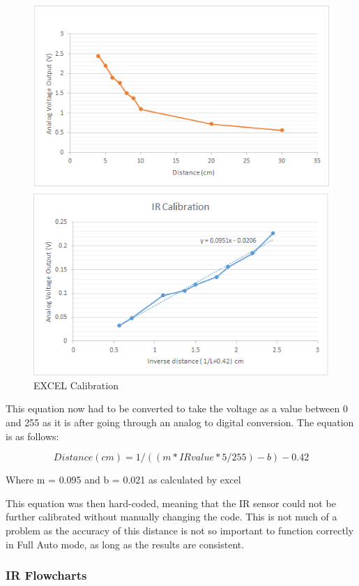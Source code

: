 \documentclass[MTRX3700report.tex]{subfiles}
\begin{document}
\begin{figure}[h]
	\includegraphics[scale=1]{IR_calibration.png}
	\centering
	\caption{EXCEL Calibration}
\end{figure}

This equation now had to be converted to take the voltage as a value between 0 and 255 as it is after going through an analog to digital conversion. The equation is as follows:

\begin{equation}
Distance (cm) = 1/((m*IRvalue*5/255)-b)-0.42
\end{equation}

Where m = 0.095 and b = 0.021 as calculated by excel

This equation was then hard-coded, meaning that the IR sensor could not be further calibrated without manually changing the code. This is not much of a problem as the accuracy of this distance is not so important to function correctly in Full Auto mode, as long as the results are consistent. 

\subsubsection{IR Flowcharts}
\end{document}
